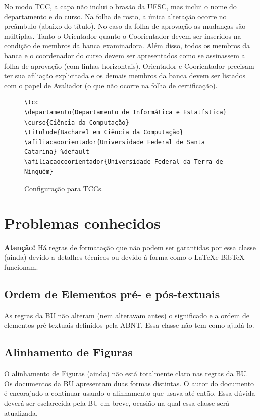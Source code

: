 \documentclass[embeddedlogo]{ufsc-thesis-rn46-2019}
\begin{document}
No modo TCC, a capa não inclui o brasão da UFSC, mas inclui o nome do
departamento e do curso. Na folha de rosto, a única alteração ocorre no
preâmbulo (abaixo do título). No caso da folha de aprovação as mudanças são
múltiplas. Tanto o Orientador quanto o Coorientador devem ser inseridos na
condição de membros da banca examinadora. Além disso, todos os membros da banca
e o coordenador do curso devem ser apresentados como se assinassem a folha de
aprovação (com linhas horizontais). Orientador e Coorientador precisam ter sua
afiliação explicitada e os demais membros da banca devem ser listados com o
papel de Avaliador (o que não ocorre na folha de certificação).

\begin{figure}[tb]
  \centering
  \caption{Configuração para TCCs.}
  \label{fig:tccs-conf}
\begin{verbatim}
\tcc
\departamento{Departamento de Informática e Estatística}
\curso{Ciência da Computação}
\titulode{Bacharel em Ciência da Computação}
\afiliacaoorientador{Universidade Federal de Santa Catarina} %default
\afiliacaocoorientador{Universidade Federal da Terra de Ninguém}
\end{verbatim}
\end{figure}





\chapter{Problemas conhecidos}
\label{ch:problems}

\textbf{Atenção!} Há regras de formatação que não podem ser garantidas por essa
classe (ainda) devido a detalhes técnicos ou devido à forma como o \LaTeX e
BibTeX funcionam.

\section{Ordem de Elementos pré- e pós-textuais}
As regras da BU não alteram (nem alteravam antes) o significado e a ordem de
elementos pré-textuais definidos pela ABNT. Essa classe não tem como ajudá-lo.

\section{Alinhamento de Figuras}
O alinhamento de Figuras (ainda) não está totalmente claro nas regras da BU. Os
documentos da BU apresentam duas formas distintas. O autor do documento é
encorajado a continuar usando o alinhamento que usava até então. Essa dúvida
deverá ser esclarecida pela BU em breve, ocasião na qual essa classe será
atualizada.
\end{document}
